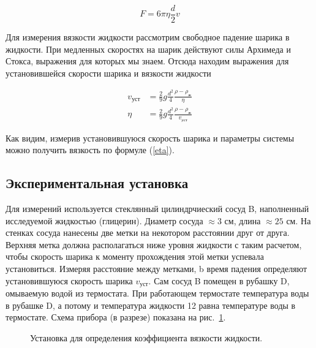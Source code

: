 \documentclass[a4paper, 12pt]{article}
\begin{document}
    \begin{equation}\label{stokes}
        F = 6\pi\eta \frac{d}{2}v
    \end{equation}


    Для измерения вязкости жидкости рассмотрим свободное падение шарика в жидкости. При медленных скоростях на шарик действуют силы Архимеда и Стокса, выражения для которых мы знаем. Отсюда находим выражения для установившейся скорости шарика и вязкости жидкости

    \begin{align}
        v_{уст}&=\frac{2}{9}g\frac{d^2}{4}\frac{\rho - \rho_ж}{\eta}\label{v_ust}\\
        \eta&=\frac{2}{9}g\frac{d^2}{4}\frac{\rho - \rho_ж}{v_{уст}}\label{eta}
    \end{align}

    Как видим, измерив установившуюся скорость шарика и параметры системы можно получить вязкость по формуле (\ref{eta}).

    \subsection{Экспериментальная установка}
    Для измерений используется стеклянный цилиндрчиеский сосуд B, наполненный исследуемой жидкостью (глицерин). Диаметр сосуда $\approx 3$ см, длина $\approx 25$ см. На стенках сосуда нанесены две метки на некотором расстоянии друг от друга. Верхняя метка должна располагаться ниже уровня жидкости с таким расчетом, чтобы скорость шарика к моменту прохождения этой метки успевала установиться. Измеряя расстояние между метками, b время падения определяют установившуюся скорость шарика $v_{уст}$. Сам сосуд B помещен в рубашку D, омываемую водой из термостата. При работающем термостате температура воды в рубашке D, а потому и температура жидкости 12 равна температуре воды в термостате.
    Схема прибора (в разрезе) показана на рис.~\ref{ustanovka}.
    \begin{figure}[ht]
        \caption{Установка для определения коэффициента вязкости жидкости.}
        \label{ustanovka}
    \end{figure}
\end{document}
